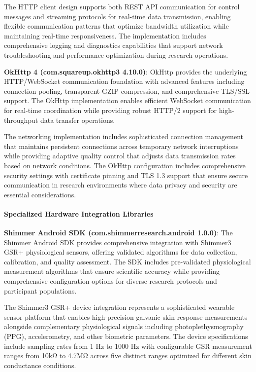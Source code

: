 \documentclass[11pt,a4paper]{report}
\begin{document}
The HTTP client design supports both REST API communication for control messages and streaming protocols for real-time
data transmission, enabling flexible communication patterns that optimize bandwidth utilization while maintaining
real-time responsiveness. The implementation includes comprehensive logging and diagnostics capabilities that support
network troubleshooting and performance optimization during research operations.

\textbf{OkHttp 4 (com.squareup.okhttp3 4.10.0)}: OkHttp provides the underlying HTTP/WebSocket communication foundation with
advanced features including connection pooling, transparent GZIP compression, and comprehensive TLS/SSL support. The
OkHttp implementation enables efficient WebSocket communication for real-time coordination while providing robust HTTP/2
support for high-throughput data transfer operations.

The networking implementation includes sophisticated connection management that maintains persistent connections across
temporary network interruptions while providing adaptive quality control that adjusts data transmission rates based on
network conditions. The OkHttp configuration includes comprehensive security settings with certificate pinning and TLS
1.3 support that ensure secure communication in research environments where data privacy and security are essential
considerations.

\paragraph{Specialized Hardware Integration Libraries}

\textbf{Shimmer Android SDK (com.shimmerresearch.android 1.0.0)}: The Shimmer Android SDK provides comprehensive integration
with Shimmer3 GSR+ physiological sensors, offering validated algorithms for data collection, calibration, and quality
assessment. The SDK includes pre-validated physiological measurement algorithms that ensure scientific accuracy while
providing comprehensive configuration options for diverse research protocols and participant populations.

The Shimmer3 GSR+ device integration represents a sophisticated wearable sensor platform that enables high-precision
galvanic skin response measurements alongside complementary physiological signals including photoplethysmography (PPG),
accelerometry, and other biometric parameters. The device specifications include sampling rates from 1 Hz to 1000 Hz
with configurable GSR measurement ranges from 10kΩ to 4.7MΩ across five distinct ranges optimized for different skin
conductance conditions.
\end{document}
